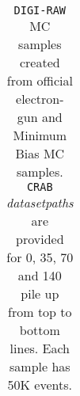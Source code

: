 \documentclass[a4paper,12pt,oneside]{article}
\begin{document}
                   \begin{table}[!htb]
                     \centering
                     \scriptsize
                     \caption{\texttt{DIGI-RAW} MC samples created from official electron-gun and Minimum Bias MC samples.
                       \texttt{CRAB} {\it datasetpaths} are provided for 0, 35, 70 and 140 pile up from top to bottom lines.
                       Each sample has 50K events.}
                     \label{tab:digi-raw}
                     \begin{tabular}{c}
\hline

\end{tabular}
\end{table}
\end{document}
